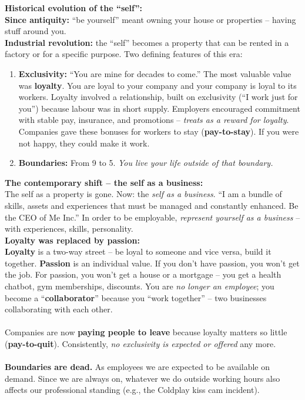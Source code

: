 \documentclass[a4paper,12pt]{article}
\begin{document}
\noindent \textbf{Historical evolution of the ``self'':} \\
\noindent \textbf{Since antiquity:} ``be yourself'' meant owning your house or properties -- having stuff around you. \\
\noindent \textbf{Industrial revolution:} the ``self'' becomes a property that can be rented in a factory or for a specific purpose. Two defining features of this era:
\begin{enumerate}
	\item \textbf{Exclusivity:} ``You are mine for decades to come.'' The most valuable value was \textbf{loyalty}. You are loyal to your company and your company is loyal to its workers. Loyalty involved a relationship, built on exclusivity (``I work just for you'') because labour was in short supply. Employers encouraged commitment with stable pay, insurance, and promotions -- \emph{treats as a reward for loyalty}. Companies gave these bonuses for workers to stay (\textbf{pay-to-stay}). If you were not happy, they could make it work.
	\item \textbf{Boundaries:} From 9 to 5. \emph{You live your life outside of that boundary.}
\end{enumerate}

\noindent \textbf{The contemporary shift -- the self as a business:} \\
\noindent The self as a property is gone. Now: the \emph{self as a business}. ``I am a bundle of skills, assets and experiences that must be managed and constantly enhanced. Be the CEO of Me Inc.'' In order to be employable, \emph{represent yourself as a business} -- with experiences, skills, personality. \\

\noindent \textbf{Loyalty was replaced by passion:} \\
\noindent \textbf{Loyalty} is a two-way street -- be loyal to someone and vice versa, build it together. \textbf{Passion} is an individual value. If you don't have passion, you won't get the job. For passion, you won't get a house or a mortgage -- you get a health chatbot, gym memberships, discounts. You are \emph{no longer an employee}; you become a ``\textbf{collaborator}'' because you ``work together'' -- two businesses collaborating with each other. \\
\\
\noindent Companies are now \textbf{paying people to leave} because loyalty matters so little (\textbf{pay-to-quit}). Consistently, \emph{no exclusivity is expected or offered} any more. \\
\\
\noindent \textbf{Boundaries are dead.} As employees we are expected to be available on demand. Since we are always on, whatever we do outside working hours also affects our professional standing (e.g., the Coldplay kiss cam incident). \\
\end{document}
